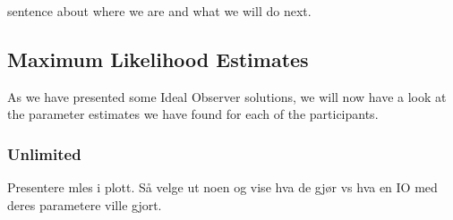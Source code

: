sentence about where we are and what we will do next. 






\subsection{Maximum Likelihood Estimates}
\label{chapter:mles}
As we have presented some Ideal Observer solutions, we will now have a look at the parameter estimates we have found for each of the participants. 


\subsubsection{Unlimited}
Presentere mles i plott. Så velge ut noen og vise hva de gjør vs hva en IO med deres parametere ville gjort. 

